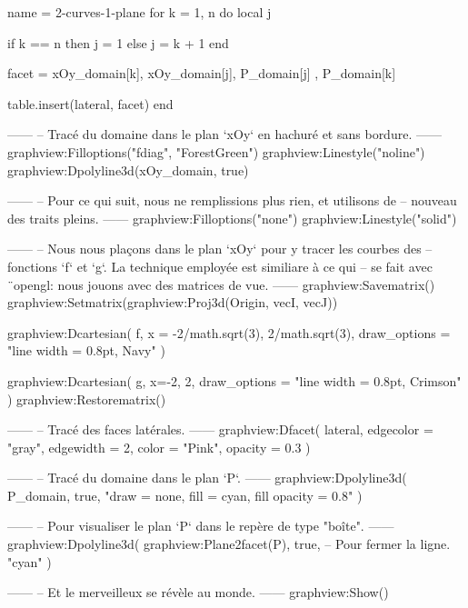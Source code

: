 \documentclass[border = 3pt]{standalone}
\begin{document}
\begin{luadraw}{name = 2-curves-1-plane}
    for k = 1, n do
        local j

        if k == n then
            j = 1
        else
            j = k + 1
        end

        facet = {
            xOy_domain[k], xOy_domain[j],
            P_domain[j]  , P_domain[k]
        }

        table.insert(lateral, facet)
    end

------
-- Tracé du domaine dans le plan `xOy` en hachuré et sans bordure.
------
    graphview:Filloptions("fdiag", "ForestGreen")
    graphview:Linestyle("noline")
    graphview:Dpolyline3d(xOy_domain, true)

------
-- Pour ce qui suit, nous ne remplissions plus rien, et utilisons de
-- nouveau des traits pleins.
------
    graphview:Filloptions("none")
    graphview:Linestyle("solid")

------
-- Nous nous plaçons dans le plan `xOy` pour y tracer les courbes des
-- fonctions  `f` et `g`. La technique employée est similiare à ce qui
-- se fait avec ¨opengl: nous jouons avec des matrices de vue.
------
    graphview:Savematrix()
        graphview:Setmatrix(graphview:Proj3d({Origin, vecI, vecJ}))

        graphview:Dcartesian(
            f,
            {x = {-2/math.sqrt(3), 2/math.sqrt(3)},
            draw_options = "line width = 0.8pt, Navy"
        })

        graphview:Dcartesian(
            g,
            {x={-2, 2},
            draw_options = "line width = 0.8pt, Crimson"
        })
    graphview:Restorematrix()

------
-- Tracé des faces latérales.
------
    graphview:Dfacet(
        lateral,
        {
            edgecolor = "gray",
            edgewidth = 2,
            color     = "Pink",
            opacity   = 0.3
        })

------
-- Tracé du domaine dans le plan `P`.
------
    graphview:Dpolyline3d(
        P_domain,
        true,
        "draw = none, fill = cyan, fill opacity = 0.8"
    )

------
-- Pour visualiser le plan `P` dans le repère de type "boîte".
------
    graphview:Dpolyline3d(
        graphview:Plane2facet(P),
        true,   -- Pour fermer la ligne.
        "cyan"
     )

------
-- Et le merveilleux se révèle au monde.
------
    graphview:Show()
\end{luadraw}
\end{document}

